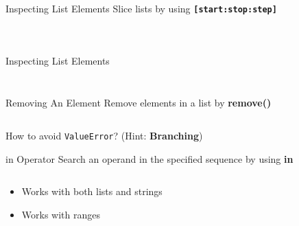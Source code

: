         \begin{frame}{Inspecting List Elements}
            \pause
            \LARGE
            Slice lists by using \texttt{\textbf{[start:stop:step]}}
            \pause
            \normalsize
            \begin{columns}
                \begin{column}{0.35\textwidth}
                \inputminted[frame=single,framesep=2pt]{python3}{code-examples/slicing.py} 
                \end{column}
               \pause 
                \begin{column}{0.65\textwidth}
                 \inputminted[frame=single,framesep=2pt]{python3}{code-examples/slicing2.py}
                \end{column} 
             \end{columns}
        \end{frame}

        \begin{frame}{Inspecting List Elements}
            \LARGE
            \pause
            \inputminted[frame=single,framesep=2pt]{python3}{code-examples/slicing3.py}
            \pause 
            \inputminted[frame=single,framesep=2pt]{python3}{code-examples/slicing4.py}
        \end{frame}
        
        \begin{frame}{Removing An Element}
            \pause
            \LARGE
            Remove elements in a list by \textbf{remove()}
            \pause              
            \bigskip
            \normalsize
            \inputminted[frame=single,framesep=2pt]{python3}{code-examples/remove.py}
            \pause
            \LARGE
            How to avoid \texttt{ValueError}? \pause (Hint: \textbf{Branching})
        \end{frame}

        \begin{frame}{in Operator}
            \pause
            \LARGE
            Search an operand in the specified sequence by using \textbf{in}
            \pause
            \bigskip
            \inputminted[frame=single,framesep=2pt]{python3}{code-examples/in_operator.py}
            \pause
            \begin{itemize}
                \item Works with both lists and strings
                \pause
                \item Works with ranges
            \end{itemize}
        \end{frame}

